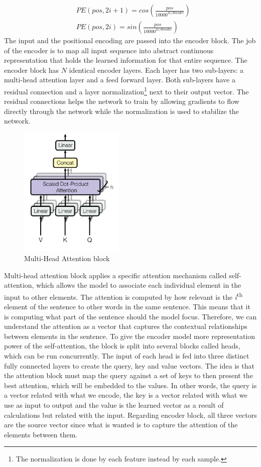 \documentclass[11pt, a4paper]{article}
\begin{document}
	\begin{align*}
	&PE(pos, 2i + 1) =cos(\frac{pos}{10000^{2i/dmodel}})\\
	&PE(pos, 2i) = sin(\frac{pos}{10000^{2i/dmodel}})
	\end{align*}
	The input and the positional encoding are passed into the encoder block. The job of the encoder is to map all input sequence into abstract continuous representation that holds the learned information for that entire sequence. The encoder block has $N$ identical encoder layers. Each layer has two sub-layers: a multi-head attention layer and a feed forward layer. Both sub-layers have a residual connection and a layer normalization\footnote{The normalization is done by each feature instead by each sample.} next to their output vector. The residual connections helps the network to train by allowing gradients to flow directly through the network while the normalization is used to stabilize the network.
	\begin{figure}[H]
		\centering
		\includegraphics[width=5cm]{imgs/relatedwork/transformer-multihead}
		\caption{Multi-Head Attention block}
		\label{fig:related-transformer-multi-head}
	\end{figure}
	Multi-head attention block applies a specific attention mechanism called self-attention, which allows the model to associate each individual element in the input to other elements. The attention is computed by how relevant is the \textit{i}\textsuperscript{th} element of the sentence to other words in the same sentence. This means that it is computing what part of the sentence should the model focus. Therefore, we can understand the attention as a vector that captures the contextual relationships between elements in the sentence.  To give the encoder model more representation power of the self-attention, the block is split into several blocks called heads, which can be run concurrently. The input of each head is fed into three distinct fully connected layers to create the query, key and value vectors. The idea is that the attention block must map the query against a set of keys to then present the best attention, which will be embedded to the values. In other words, the query is a vector related with what we encode, the key is a vector related with what we use as input to output and the value is the learned vector as a result of calculations but related with the input. Regarding encoder block, all three vectors are the source vector since what is wanted is to capture the attention of the elements between them.
\end{document}
